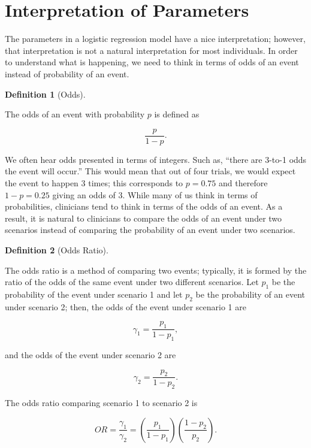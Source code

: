 \documentclass[
  letterpaper,
  DIV=11,
  numbers=noendperiod]{scrreprt}
\theoremstyle{definition}
\newtheorem{definition}{Definition}[chapter]
\theoremstyle{definition}
\theoremstyle{remark}
\begin{document}
\hypertarget{interpretation-of-parameters-1}{%
\section{Interpretation of
Parameters}\label{interpretation-of-parameters-1}}

The parameters in a logistic regression model have a nice
interpretation; however, that interpretation is not a natural
interpretation for most individuals. In order to understand what is
happening, we need to think in terms of odds of an event instead of
probability of an event.

\begin{definition}[Odds]\protect\hypertarget{def-odds}{}\label{def-odds}

The odds of an event with probability \(p\) is defined as

\[\frac{p}{1-p}.\]

\end{definition}

We often hear odds presented in terms of integers. Such as, ``there are
3-to-1 odds the event will occur.'' This would mean that out of four
trials, we would expect the event to happen 3 times; this corresponds to
\(p = 0.75\) and therefore \(1 - p = 0.25\) giving an odds of 3. While
many of us think in terms of probabilities, clinicians tend to think in
terms of the odds of an event. As a result, it is natural to clinicians
to compare the odds of an event under two scenarios instead of comparing
the probability of an event under two scenarios.

\begin{definition}[Odds
Ratio]\protect\hypertarget{def-or}{}\label{def-or}

The odds ratio is a method of comparing two events; typically, it is
formed by the ratio of the odds of the same event under two different
scenarios. Let \(p_1\) be the probability of the event under scenario 1
and let \(p_2\) be the probability of an event under scenario 2; then,
the odds of the event under scenario 1 are

\[\gamma_1 = \frac{p_1}{1 - p_1},\]

and the odds of the event under scenario 2 are

\[\gamma_2 = \frac{p_2}{1 - p_2}.\]

The odds ratio comparing scenario 1 to scenario 2 is

\[OR = \frac{\gamma_1}{\gamma_2} = \left(\frac{p_1}{1 - p_1}\right) \left(\frac{1 - p_2}{p_2}\right).\]

\end{definition}
\end{document}
